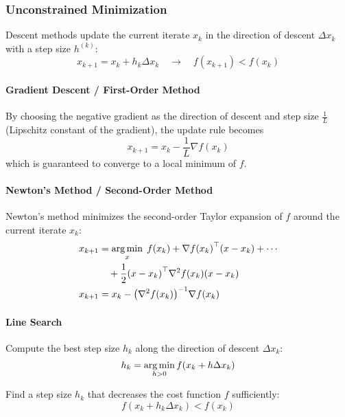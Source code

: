 \subsubsection{Unconstrained Minimization}
Descent methods update the current iterate $x_k$ in the direction of descent $\Delta x_k$ with a step size $h^{(k)}$:
\begin{equation*}
    x_{k+1} = x_k +h_k \Delta x_k \quad \to \quad f(x_{k+1}) < f(x_k)
\end{equation*}

\paragraph{Gradient Descent / First-Order Method}
By choosing the negative gradient as the direction of descent and step size $\frac{1}{L}$ (Lipschitz constant of the gradient), the update rule becomes
\begin{equation*}
    x_{k+1} = x_k - \frac{1}{L} \nabla f(x_k)
\end{equation*}
which is guaranteed to converge to a local minimum of $f$.
\paragraph{Newton's Method / Second-Order Method}
Newton's method minimizes the second-order Taylor expansion of $f$ around the current iterate $x_k$:
\begin{align*}
    x_{k+1} & = \operatorname*{arg\,min}_{x} \; f(x_k) + \nabla {f(x_k)}^\top (x-x_k) + \cdots \\
            & \quad + \frac{1}{2}{(x-x_k)}^\top \nabla^2 f(x_k)(x-x_k)        \\
    x_{k+1} & = x_k - {\left( \nabla^2 f(x_k) \right)}^{-1} \nabla f(x_k)
\end{align*}

\paragraph{Line Search}

Compute the best step size $h_k$ along the direction of descent $\Delta x_k$:
\begin{equation*}
    h_k = \operatorname*{arg\,min}_{h>0} f(x_k + h \Delta x_k)
\end{equation*}

\newpar{}

Find a step size $h_k$ that decreases the cost function $f$ sufficiently:
\begin{equation*}
    f(x_k + h_k \Delta x_k) < f(x_k)
\end{equation*}


